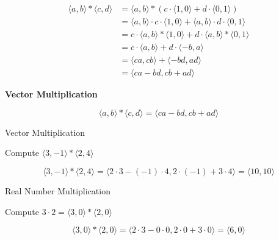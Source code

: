 \documentclass{ximera}
\begin{document}
\begin{align*}
\langle a, b \rangle  * \langle c, d \rangle & = \langle a, b \rangle  * (  c \cdot \langle 1, 0 \rangle    +  d \cdot \langle 0, 1 \rangle    )    \\
    & = \langle a, b \rangle \cdot c \cdot \langle 1, 0 \rangle     +      \langle a, b \rangle \cdot d \cdot \langle 0, 1 \rangle      \\
    & = c \cdot \langle a, b \rangle *  \langle 1, 0 \rangle     +    d \cdot  \langle a, b \rangle *  \langle 0, 1 \rangle      \\
    & = c \cdot \langle a, b \rangle   + d \cdot  \langle -b, a \rangle \\
    & =  \langle c a, c b \rangle   +   \langle -b d, a d \rangle \\
    & =  \langle c a - b d, c b + a d \rangle   
\end{align*} 







\begin{definition}  \textbf{\textcolor{green!50!black}{Vector Multiplication}}  


\[    \langle a, b \rangle  * \langle c, d \rangle =   \langle c a - b d, c b + a d \rangle   \]


\end{definition}








\begin{example} Vector Multiplication

Compute  $\langle 3, -1 \rangle  * \langle 2, 4 \rangle$

\begin{explanation}


\[
\langle 3, -1 \rangle  * \langle 2, 4 \rangle = \langle 2 \cdot 3 - (-1) \cdot 4, 2 \cdot (-1) + 3 \cdot 4 \rangle = \langle 10, 10 \rangle 
\]
\end{explanation}

\end{example}











\begin{example} Real Number Multiplication

Compute  $3 \cdot 2 = \langle 3, 0 \rangle  * \langle 2, 0 \rangle$

\begin{explanation}


\[
\langle 3, 0 \rangle  * \langle 2, 0 \rangle = \langle 2 \cdot 3 - 0 \cdot 0, 2 \cdot 0 + 3 \cdot 0 \rangle = \langle 6, 0 \rangle 
\]
\end{explanation}

\end{example}
\end{document}
